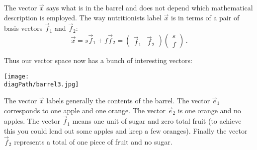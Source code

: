 {The vector $\vec x$ says what is in the barrel and does not depend which mathematical description is employed. The way nutritionists label $\vec x$ 
is in terms of a pair of basis vectors $\vec f_1$ and $\vec f_2$:
$$
\vec x=s \vec f_1 + f \vec f_2=\begin{pmatrix}\vec f_1 & \vec f_2\end{pmatrix}\begin{pmatrix}s \\ f\end{pmatrix}\, .
$$

Thus our vector space now has a bunch of interesting vectors:
\begin{center}
\texttt{[image: \\diagPath/barrel3.jpg]}
\end{center}
The vector $\vec x$ labels generally the contents of the barrel. The 
vector $\vec e_1$ corresponds to one apple and one orange. The vector $\vec e_2$ is one orange and no apples. The vector $\vec f_1$ means one unit of sugar and zero total fruit (to achieve this you could  lend out some apples and keep a few oranges). Finally the vector $\vec f_2$ represents a total of one piece of fruit and no sugar.

}

